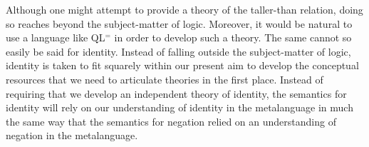 %


Although one might attempt to provide a theory of the taller-than relation, doing so reaches beyond the subject-matter of logic.
Moreover, it would be natural to use a language like QL$^=$ in order to develop such a theory. 
The same cannot so easily be said for identity.
Instead of falling outside the subject-matter of logic, identity is taken to fit squarely within our present aim to develop the conceptual resources that we need to articulate theories in the first place.
Instead of requiring that we develop an independent theory of identity, the semantics for identity will rely on our understanding of identity in the metalanguage in much the same way that the semantics for negation relied on an understanding of negation in the metalanguage.


